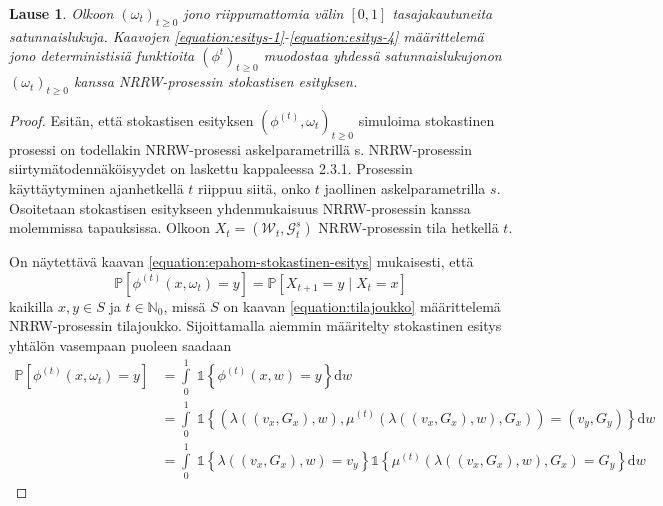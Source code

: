 \documentclass[finnish, 12pt, a4paper, sci, utf8, pdfa]{aaltothesis}
\newcommand{\N}{\mathbb{N}}
\newcommand{\Grandom}{\mathcal{G}}
\newcommand{\Wrandom}{\mathcal{W}}
\newcommand{\indicator}{\mathopen{\mathds{1}}}
\newcommand*{\prob}{\mathbb{P}}
\newtheorem{theorem}{Lause}
\begin{document}
\begin{theorem}
Olkoon $ (\omega_{t})_{t \geq 0} $ jono riippumattomia välin $ [0, 1] $ tasajakautuneita satunnaislukuja. Kaavojen \ref{equation:esitys-1}-\ref{equation:esitys-4} määrittelemä jono deterministisiä funktioita $ (\phi^{t})_{t \geq 0} $ muodostaa yhdessä satunnaislukujonon $ (\omega_{t})_{t \geq 0} $ kanssa NRRW-prosessin stokastisen esityksen.
\end{theorem}

\begin{proof}

Esitän, että stokastisen esityksen \( (\phi^{(t)}, \omega_{t})_{t \geq 0} \) simuloima stokastinen prosessi on todellakin NRRW-prosessi askelparametrillä s. NRRW-prosessin siirtymätodennäköisyydet on laskettu kappaleessa 2.3.1. Prosessin käyttäytyminen ajanhetkellä $ t $ riippuu siitä, onko $ t $ jaollinen askelparametrilla $ s $. Osoitetaan stokastisen esitykseen yhdenmukaisuus NRRW-prosessin kanssa molemmissa tapauksissa. Olkoon $ X_{t} = (\Wrandom_{t}, \Grandom^{s}_{t}) $ NRRW-prosessin tila hetkellä $ t $. 

On näytettävä kaavan \ref{equation:epahom-stokastinen-esitys} mukaisesti, että
\[
   \prob \left[ \phi^{(t)}(x, \omega_{t}) = y \right] = \prob \left[ X_{t+1} = y \mid X_{t} = x \right] 
\]
kaikilla $ x, y \in S $ ja $ t \in \N_{0} $, missä $ S $ on kaavan \ref{equation:tilajoukko} määrittelemä NRRW-prosessin tilajoukko. Sijoittamalla aiemmin määritelty stokastinen esitys yhtälön vasempaan puoleen saadaan
\begin{align*}
   \prob \left[ \phi^{(t)}(x, \omega_{t}) = y \right] &= \int\limits_0^1 \; \indicator \left\{ \phi^{(t)}(x, w) = y \right\} \mathrm{d}w \\
                                                &= \int\limits_0^1 \; \indicator \left\{ \left( \lambda\left( (v_{x}, G_{x}), w \right), \mu^{(t)} \left( \lambda\left( (v_{x}, G_{x}), w \right), G_{x} \right) \right) = (v_{y}, G_{y}) \right\} \mathrm{d}w \\
                                                &= \int\limits_0^1 \; \indicator \left\{ \lambda\left( (v_{x}, G_{x}), w \right) = v_{y} \right\} \indicator \left\{ \mu^{(t)} \left( \lambda\left( (v_{x}, G_{x}), w \right), G_{x} \right) = G_{y} \right\} \mathrm{d}w
\end{align*}


\end{proof}
\end{document}
